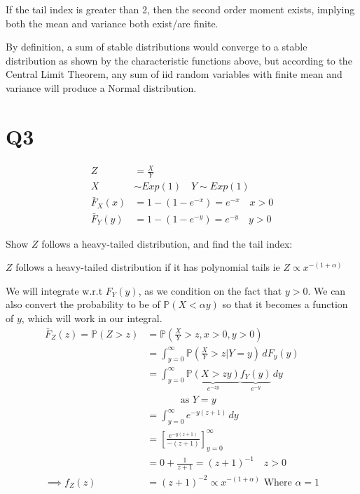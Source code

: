 \documentclass[
  oneside]{book}
\begin{document}
If the tail index is greater than 2, then the second order moment exists, implying both the mean and variance both exist/are finite.

By definition, a sum of stable distributions would converge to a stable distribution as shown by the characteristic functions above, but according to the Central Limit Theorem, any sum of iid random variables with finite mean and variance will produce a Normal distribution.

\hypertarget{q3-1}{%
\section{Q3}\label{q3-1}}

\[
\begin{aligned}
Z&=\frac{X}{Y}\\
X &\sim Exp(1) \quad Y \sim Exp(1)\\
\bar{F}_{X}(x) &= 1-(1-e^{-x}) = e^{-x}\quad x > 0\\
\bar{F}_{Y}(y) &= 1-(1-e^{-y}) = e^{-y}\quad y > 0
\end{aligned}
\]

Show \(Z\) follows a heavy-tailed distribution, and find the tail index:

\(Z\) follows a heavy-tailed distribution if it has polynomial tails ie \(Z \propto x^{-(1+\alpha)}\)

We will integrate w.r.t \(F_{Y}(y)\), as we condition on the fact that \(y>0\). We can also convert the probability to be of \(\mathbb{P}(X<\alpha y)\) so that it becomes a function of \(y\), which will work in our integral.
\[
\begin{aligned}
\bar{F}_{Z}(z) = \mathbb{P}(Z > z) &= \mathbb{P}\left( \frac{X}{Y} > z, x > 0, y > 0\right)\\
&= \int_{y=0}^{\infty}\mathbb{P}\left( \frac{X}{Y} > z | Y = y \right) \, dF_{y}(y)\\
&= \int _{y=0}^{\infty}\underbrace{ \mathbb{P}(X > zy) }_{ e^{-zy} }\underbrace{ f_{Y}(y) }_{ e^{-y} } \, dy\\
&\quad \quad \quad \ \ \text{as } Y = y\\
&= \int ^{\infty}_{y=0} e^{-y(z+1)}\, dy\\
&= \left[ \frac{e^{-y(z+1)}}{-(z+1)} \right]^{\infty}_{y=0}\\
&= 0 + \frac{1}{z+1} = (z+1)^{-1} \quad z > 0\\
\implies f_{Z}(z) &= (z+1)^{-2} \propto x^{-(1+\alpha)} \text{ Where } \alpha = 1
\end{aligned}
\]
\end{document}
